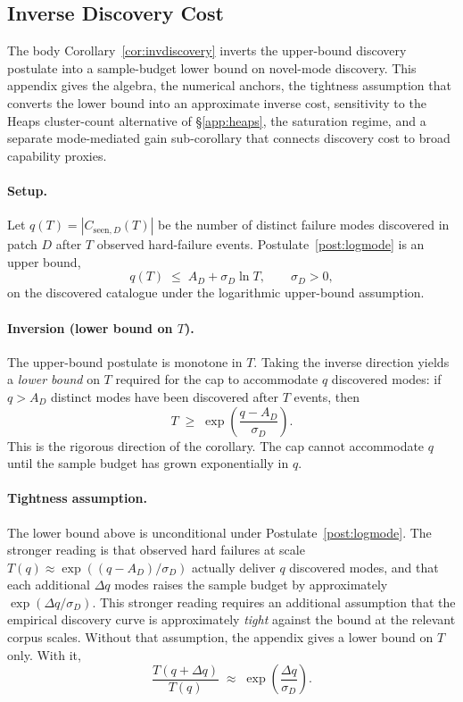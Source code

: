\documentclass{article}
\theoremstyle{taeplain}
\theoremstyle{taedefn}
\newcommand{\teApprox}{\ensuremath{\approx}}
\begin{document}
\subsection{Inverse Discovery Cost}
\label{app:invdiscovery}

The body Corollary~\ref{cor:invdiscovery} inverts the upper-bound discovery postulate into a sample-budget lower bound on novel-mode discovery. This appendix gives the algebra, the numerical anchors, the tightness assumption that converts the lower bound into an approximate inverse cost, sensitivity to the Heaps cluster-count alternative of \S\ref{app:heaps}, the saturation regime, and a separate mode-mediated gain sub-corollary that connects discovery cost to broad capability proxies.

\paragraph{Setup.}
Let $q(T) = |C_{\text{seen},D}(T)|$ be the number of distinct failure modes discovered in patch $D$ after $T$ observed hard-failure events. Postulate~\ref{post:logmode} is an upper bound,
\[
q(T) \;\leq\; A_D + \sigma_D \ln T, \qquad \sigma_D > 0,
\]
on the discovered catalogue under the logarithmic upper-bound assumption.

\paragraph{Inversion (lower bound on $T$).}
The upper-bound postulate is monotone in $T$. Taking the inverse direction yields a \emph{lower bound} on $T$ required for the cap to accommodate $q$ discovered modes: if $q > A_D$ distinct modes have been discovered after $T$ events, then
\[
T \;\geq\; \exp\!\left(\frac{q - A_D}{\sigma_D}\right).
\]
This is the rigorous direction of the corollary. The cap cannot accommodate $q$ until the sample budget has grown exponentially in $q$.

\paragraph{Tightness assumption.}
The lower bound above is unconditional under Postulate~\ref{post:logmode}. The stronger reading is that observed hard failures at scale $T(q) \teApprox \exp((q - A_D)/\sigma_D)$ actually deliver $q$ discovered modes, and that each additional $\Delta q$ modes raises the sample budget by approximately $\exp(\Delta q/\sigma_D)$. This stronger reading requires an additional assumption that the empirical discovery curve is approximately \emph{tight} against the bound at the relevant corpus scales. Without that assumption, the appendix gives a lower bound on $T$ only. With it,
\[
\frac{T(q + \Delta q)}{T(q)} \;\approx\; \exp\!\left(\frac{\Delta q}{\sigma_D}\right).
\]
\end{document}
